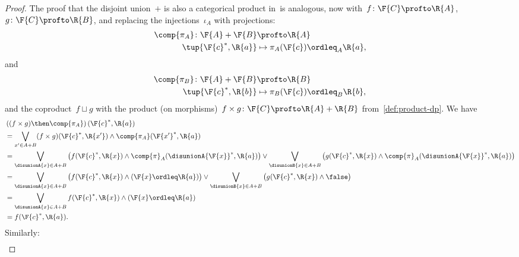 \begin{proof}
	The proof that the disjoint union~$+$ is also a categorical product in~\DP is analogous, now with~$f \colon \F{C} \profto \R{A}$,~$g \colon \F{C} \profto \R{B}$, and replacing the injections~$\iota_A$ with projections:
	\begin{equation}
		\begin{aligned}
			\comp{\pi_A} \colon \F{A}+\F{B} & \profto \R{A}                        \\
			\tup{\F{c}^*,\R{a}}             & \mapsto \pi_A(\F{c})\ordleq_A \R{a},
		\end{aligned}
	\end{equation}
	and
	\begin{equation}
		\begin{aligned}
			\comp{\pi_B} \colon \F{A}+\F{B} & \profto \R{B}                        \\
			\tup{\F{c}^*,\R{b}}             & \mapsto \pi_B(\F{c})\ordleq_B \R{b},
		\end{aligned}
	\end{equation}
	and the coproduct~$f \sqcup g$ with the product (on morphisms)~$f \times g \colon \F{C} \profto \R{A} + \R{B}$ from~\cref{def:product-dp}.
	We have
	\begin{equation}
		\begin{aligned}
			 & \left((f\times g)\then \comp{\pi_A}\right)(\F{c}^*,\R{a})                                                         \\
			 & =\bigvee_{x'\in A+B} (f\times g)(\F{c}^*,\R{x'}) \wedge \comp{\pi_A}(\F{x'}^*,\R{a})                              \\
			 & =\bigvee_{\disunionA{x}\in A+B}\left( f(\F{c}^*,\R{x}) \wedge \comp{\pi}_A(\disunionA{\F{x}}^*,\R{a})\right) \vee
			\bigvee_{\disunionB{x}\in A+B}\left( g(\F{c}^*,\R{x}) \wedge \comp{\pi}_A(\disunionA{\F{x}}^*,\R{a})\right)          \\
			 & =\bigvee_{\disunionA{x}\in A+B}\left( f(\F{c}^*,\R{x}) \wedge (\F{x}\ordleq \R{a})\right) \vee
			\bigvee_{\disunionB{x}\in A+B}\left( g(\F{c}^*,\R{x}) \wedge \false \right)                                          \\
			 & =\bigvee_{\disunionA{x}\in A+B} f(\F{c}^*,\R{x}) \wedge (\F{x}\ordleq \R{a})                                      \\
			 & =f(\F{c}^*,\R{a}).
		\end{aligned}
	\end{equation}
	Similarly:
	\begin{equation}
		\begin{aligned}

\end{aligned}
\end{equation}
\end{proof}
